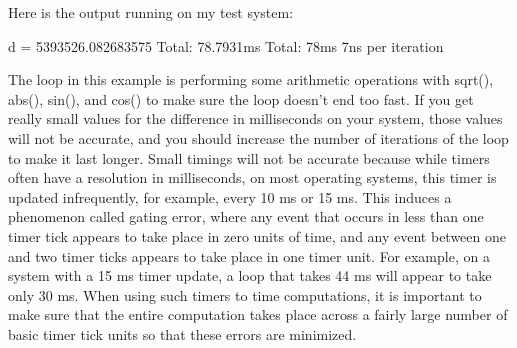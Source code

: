 Here is the output running on my test system:

\begin{shell}
d = 5393526.082683575
Total: 78.7931ms
Total: 78ms
7ns per iteration
\end{shell}

The loop in this example is performing some arithmetic operations with sqrt(), abs(), sin(), and cos() to make sure the loop doesn’t end too fast. If you get really small values for the difference in milliseconds on your system, those values will not be accurate, and you should increase the number of iterations of the loop to make it last longer. Small timings will not be accurate because while timers often have a resolution in milliseconds, on most operating systems, this timer is updated infrequently, for example, every 10 ms or 15 ms. This induces a phenomenon called gating error, where any event that occurs in less than one timer tick appears to take place in zero units of time, and any event between one and two timer ticks appears to take place in one timer unit. For example, on a system with a 15 ms timer update, a loop that takes 44 ms will appear to take only 30 ms. When using such timers to time computations, it is important to make sure that the entire computation takes place across a fairly large number of basic timer tick units so that these errors are minimized.
































